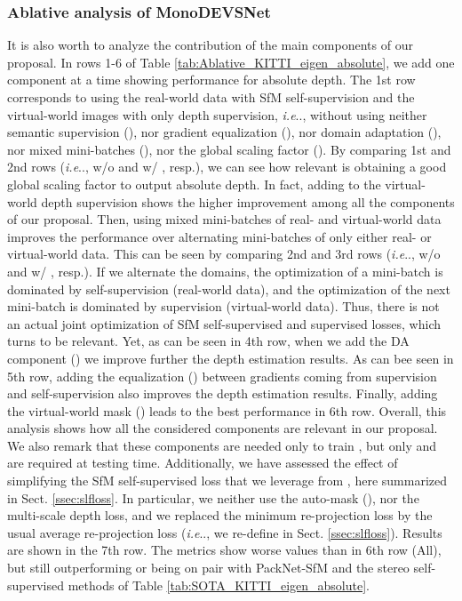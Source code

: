 \documentclass[journal]{IEEEtran}
\makeatletter
\DeclareRobustCommand\onedot{\futurelet\@let@token\@onedot}
\def\@onedot{\ifx\@let@token.\else.\null\fi\xspace}
\def\ie{\emph{i.e}\onedot} \def\Ie{\emph{I.e}\onedot}
\newcommand{\sSect}[1]{Sect. \ref{ssec:#1}}
\newcommand{\Tab}[1]{Table \ref{tab:#1}}
\makeatother
\begin{document}
\subsubsection{Ablative analysis of MonoDEVSNet}
It is also worth to analyze the contribution of the main components of our proposal. In rows 1-6 of \Tab{Ablative_KITTI_eigen_absolute}, we add one component at a time showing performance for absolute depth. The 1st row corresponds to using the real-world data with SfM self-supervision and the virtual-world images with only depth supervision, {\ie}, without using neither semantic supervision (), nor gradient equalization (), nor domain adaptation (), nor mixed mini-batches (), nor the global scaling factor (). By comparing 1st and 2nd rows ({\ie}, w/o  and w/ , resp.), we can see how relevant is obtaining a good global scaling factor to output absolute depth. In fact, adding  to the virtual-world depth supervision shows the higher improvement among all the components of our proposal. Then, using mixed mini-batches of real- and virtual-world data improves the performance over alternating mini-batches of only either real- or virtual-world data. This can be seen by comparing 2nd and 3rd rows ({\ie}, w/o  and w/ , resp.). If we alternate the domains, the optimization of a mini-batch is dominated by self-supervision (real-world data), and the optimization of the next mini-batch is dominated by supervision (virtual-world data). Thus, there is not an actual joint optimization of SfM self-supervised and supervised losses, which turns to be relevant. Yet, as can be seen in 4th row, when we add the DA component () we improve further the depth estimation results. As can bee seen in 5th row, adding the equalization () between gradients coming from supervision and self-supervision also improves the depth estimation results. Finally, adding the virtual-world mask () leads to the best performance in 6th row. Overall, this analysis shows how all the considered components are relevant in our proposal. We also remark that these components are needed only to train , but only  and  are required at testing time. Additionally, we have assessed the effect of simplifying the SfM self-supervised loss that we leverage from \cite{Godard:2019MonoDepth2}, here summarized in \sSect{slfloss}. In particular, we neither use the auto-mask (), nor the multi-scale depth loss, and we replaced the minimum re-projection loss by the usual average re-projection loss ({\ie}, we re-define  in \sSect{slfloss}). Results are shown in the 7th row. The metrics show worse values than in 6th row (All), but still outperforming or being on pair with PackNet-SfM and the stereo self-supervised methods of \Tab{SOTA_KITTI_eigen_absolute}. 
\end{document}
